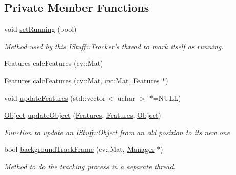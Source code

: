 \subsection*{Private Member Functions}
\begin{DoxyCompactItemize}
\item 
void \hyperlink{class_i_stuff_1_1_tracker_a0f512d1134b48840d65547bc60d2dd7d}{set\-Running} (bool)
\begin{DoxyCompactList}\small\item\em Method used by this \hyperlink{class_i_stuff_1_1_tracker}{I\-Stuff\-::\-Tracker}'s thread to mark itself as running. \end{DoxyCompactList}\item 
\hyperlink{namespace_i_stuff_a2d680b8d3ea1fa53d1aa740cc669063c}{Features} \hyperlink{class_i_stuff_1_1_tracker_a66a0adf34335915897834cb9b2829734}{calc\-Features} (cv\-::\-Mat)
\item 
\hyperlink{namespace_i_stuff_a2d680b8d3ea1fa53d1aa740cc669063c}{Features} \hyperlink{class_i_stuff_1_1_tracker_afe28de2d37bde1c290bf8405a9976563}{calc\-Features} (cv\-::\-Mat, cv\-::\-Mat, \hyperlink{namespace_i_stuff_a2d680b8d3ea1fa53d1aa740cc669063c}{Features} $\ast$)
\item 
void \hyperlink{class_i_stuff_1_1_tracker_a2e7825806f53813c4ba1a6088dbd5a6c}{update\-Features} (std\-::vector$<$ uchar $>$ $\ast$=N\-U\-L\-L)
\item 
\hyperlink{class_i_stuff_1_1_object}{Object} \hyperlink{class_i_stuff_1_1_tracker_a3d9b861a3cf475309dda610d68b5dbd5}{update\-Object} (\hyperlink{namespace_i_stuff_a2d680b8d3ea1fa53d1aa740cc669063c}{Features}, \hyperlink{namespace_i_stuff_a2d680b8d3ea1fa53d1aa740cc669063c}{Features}, \hyperlink{class_i_stuff_1_1_object}{Object})
\begin{DoxyCompactList}\small\item\em Function to update an \hyperlink{class_i_stuff_1_1_object}{I\-Stuff\-::\-Object} from an old position to its new one. \end{DoxyCompactList}\item 
bool \hyperlink{class_i_stuff_1_1_tracker_a26eecfd128d97776101938b59f13c987}{background\-Track\-Frame} (cv\-::\-Mat, \hyperlink{class_i_stuff_1_1_manager}{Manager} $\ast$)
\begin{DoxyCompactList}\small\item\em Method to do the tracking process in a separate thread. \end{DoxyCompactList}\end{DoxyCompactItemize}
